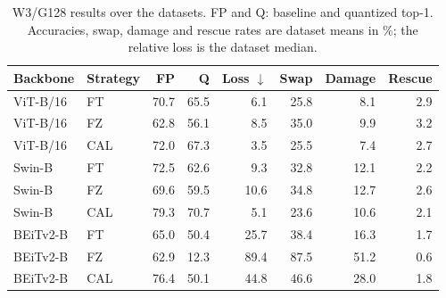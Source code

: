 \begin{table}[t]
\centering
\caption{W3/G128 results over the {} datasets. FP and Q: baseline and quantized top-1. Accuracies, swap, damage and rescue rates are dataset means in \%; the relative loss is the dataset median.}
\label{tab:w3}
\setlength{\tabcolsep}{2.2pt}
\small
\begin{tabular}{llrrrrrr}
\toprule
Backbone & Strategy & FP & Q & Loss $\downarrow$ & Swap & Damage & Rescue \\
\midrule
ViT-B/16 & FT & 70.7 & 65.5 & 6.1 & 25.8 & 8.1 & 2.9 \\
ViT-B/16 & FZ & 62.8 & 56.1 & 8.5 & 35.0 & 9.9 & 3.2 \\
ViT-B/16 & CAL & 72.0 & 67.3 & 3.5 & 25.5 & 7.4 & 2.7 \\
Swin-B & FT & 72.5 & 62.6 & 9.3 & 32.8 & 12.1 & 2.2 \\
Swin-B & FZ & 69.6 & 59.5 & 10.6 & 34.8 & 12.7 & 2.6 \\
Swin-B & CAL & 79.3 & 70.7 & 5.1 & 23.6 & 10.6 & 2.1 \\
BEiTv2-B & FT & 65.0 & 50.4 & 25.7 & 38.4 & 16.3 & 1.7 \\
BEiTv2-B & FZ & 62.9 & 12.3 & 89.4 & 87.5 & 51.2 & 0.6 \\
BEiTv2-B & CAL & 76.4 & 50.1 & 44.8 & 46.6 & 28.0 & 1.8 \\
\bottomrule
\end{tabular}
\end{table}
